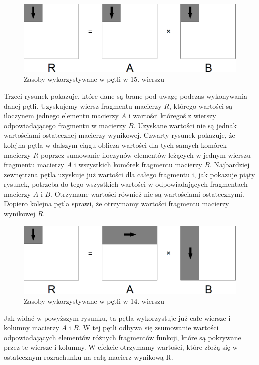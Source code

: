\documentclass{article}
\begin{document}
\begin{figure}[H]
	\centering
	\includegraphics[width=\linewidth]{./images/6/lokIn3.png}
	\caption{Zasoby wykorzystywane w pętli w 15. wierszu}
	\label{fig:6inner3}
\end{figure}

Trzeci rysunek pokazuje, które dane są brane pod uwagę podczas wykonywania danej pętli. Uzyskujemy wiersz fragmentu macierzy $R$, którego wartości są iloczynem jednego elementu macierzy $A$ i wartości któregoś z wierszy odpowiadającego fragmentu w macierzy $B$. Uzyskane wartości nie są jednak wartościami ostatecznej macierzy wynikowej. Czwarty rysunek pokazuje, że kolejna pętla w dalszym ciągu oblicza wartości dla tych samych komórek macierzy $R$ poprzez sumowanie iloczynów elementów leżących w jednym wierszu fragmentu macierzy $A$ i wszystkich komórek fragmentu macierzy $B$. Najbardziej zewnętrzna pętla uzyskuje już wartości dla całego fragmentu i, jak pokazuje piąty rysunek, potrzeba do tego wszystkich wartości w odpowiadających fragmentach macierzy $A$ i $B$. Otrzymane wartości również nie są wartościami ostatecznymi. Dopiero kolejna pętla sprawi, że otrzymamy wartości fragmentu macierzy wynikowej $R$.

\begin{figure}[H]
	\centering
	\includegraphics[width=\linewidth]{./images/6/lokMed.png}
	\caption{Zasoby wykorzystywane w pętli w 14. wierszu}
	\label{fig:6medium}
\end{figure}

Jak widać w powyższym rysunku, ta pętla wykorzystuje już całe wiersze i kolumny macierzy $A$ i $B$. W tej pętli odbywa się zsumowanie wartości odpowiadających elementów różnych fragmentów funkcji, które są pokrywane przez te wiersze i kolumny. W efekcie otrzymamy wartości, które złożą się w ostatecznym rozrachunku na całą macierz wynikową R.
\end{document}
